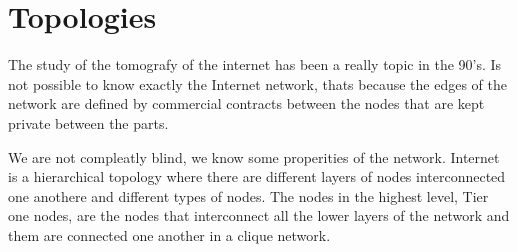 \section{Topologies}
\label{sec:topologies}


The study of the tomografy of the internet has been a really  topic in the
90's.
Is not possible to know exactly the Internet network, thats because the edges
of the network are defined by commercial contracts between the nodes that are 
kept private between the parts.

We are not compleatly blind, we know some properities of the network.
Internet is a hierarchical topology where there
are different layers of nodes interconnected one anothere and different types of
nodes.
The nodes in the highest level, Tier one nodes, are the nodes that interconnect
all the lower layers of the network and them are
connected one another in a clique network.

